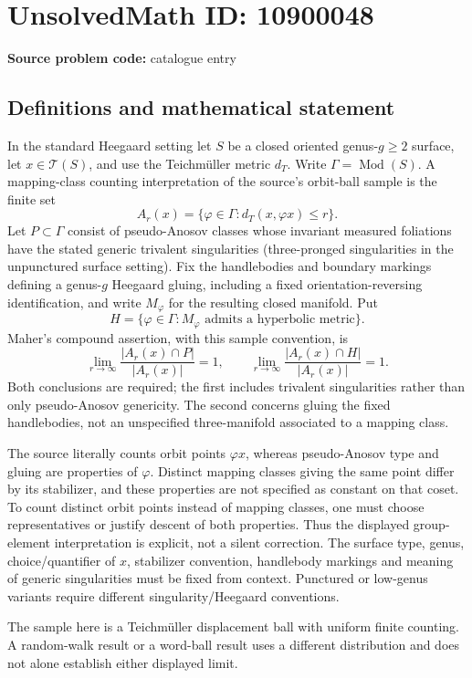 \documentclass[11pt]{article}
\begin{document}
\section*{UnsolvedMath ID: 10900048}
\textbf{Source problem code:} catalogue entry
\subsection{Definitions and mathematical statement}
In the standard Heegaard setting let \(S\) be a closed oriented genus-\(g\geq2\) surface, let \(x\in\mathcal T(S)\), and use the Teichm\"uller metric \(d_T\). Write \(\Gamma=\operatorname{Mod}(S)\). A mapping-class counting interpretation of the source's orbit-ball sample is the finite set
\[A_r(x)=\{\varphi\in\Gamma:d_T(x,\varphi x)\leq r\}.\]
Let \(P\subset\Gamma\) consist of pseudo-Anosov classes whose invariant measured foliations have the stated generic trivalent singularities (three-pronged singularities in the unpunctured surface setting). Fix the handlebodies and boundary markings defining a genus-\(g\) Heegaard gluing, including a fixed orientation-reversing identification, and write \(M_\varphi\) for the resulting closed manifold. Put
\[H=\{\varphi\in\Gamma:M_\varphi\text{ admits a hyperbolic metric}\}.\]
Maher's compound assertion, with this sample convention, is
\[\lim_{r\to\infty}\frac{|A_r(x)\cap P|}{|A_r(x)|}=1,\qquad
\lim_{r\to\infty}\frac{|A_r(x)\cap H|}{|A_r(x)|}=1.\]
Both conclusions are required; the first includes trivalent singularities rather than only pseudo-Anosov genericity. The second concerns gluing the fixed handlebodies, not an unspecified three-manifold associated to a mapping class.

The source literally counts orbit points \(\varphi x\), whereas pseudo-Anosov type and gluing are properties of \(\varphi\). Distinct mapping classes giving the same point differ by its stabilizer, and these properties are not specified as constant on that coset. To count distinct orbit points instead of mapping classes, one must choose representatives or justify descent of both properties. Thus the displayed group-element interpretation is explicit, not a silent correction. The surface type, genus, choice/quantifier of \(x\), stabilizer convention, handlebody markings and meaning of generic singularities must be fixed from context. Punctured or low-genus variants require different singularity/Heegaard conventions.

The sample here is a Teichm\"uller displacement ball with uniform finite counting. A random-walk result or a word-ball result uses a different distribution and does not alone establish either displayed limit.
\end{document}
